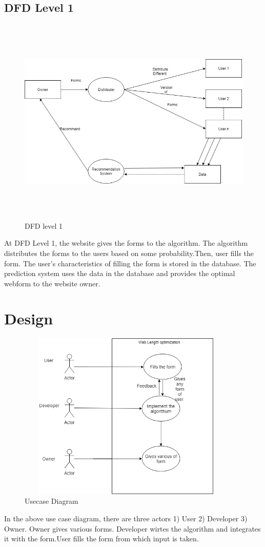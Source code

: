 \documentclass[12pt]{report}
\begin{document}
\subsection{DFD Level 1}
\begin{figure}[!ht]
\hspace*{-30px}\includegraphics[scale=0.7,width=16cm,height=10cm]{dfd1.jpg}
\caption{DFD level 1}
\end{figure}
At DFD Level 1, the website gives the forms to the algorithm. The algorithm distributes the forms to the users based on some probability.Then, user fills the form. The user's characteristics of filling the form is stored in the database. The prediction system uses the data in the database and provides the optimal webform to the website owner.
\newpage
\section{Design}
\hspace*{-100px} \begin{figure}[!ht]
\includegraphics[scale=0.7,height=8cm,width=10.5cm]{usecase.png}
\caption{Usecase Diagram}
\end{figure}
\newline
In the above use case diagram, there are three actors 1) User 2) Developer 3) Owner. Owner gives various forms. Developer wirtes the algorithm and integrates it with the form.User fills the form from which input is taken.
\end{document}
